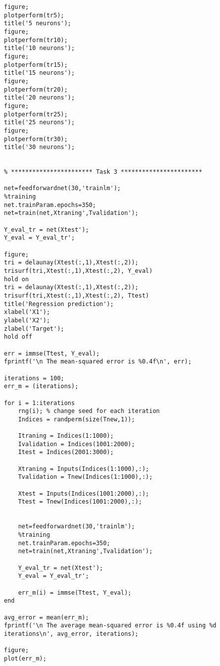 \begin{lstlisting}[frame=single]
figure;
plotperform(tr5);
title('5 neurons');
figure;
plotperform(tr10);
title('10 neurons');
figure;
plotperform(tr15);
title('15 neurons');
figure;
plotperform(tr20);
title('20 neurons');
figure;
plotperform(tr25);
title('25 neurons');
figure;
plotperform(tr30);
title('30 neurons');


% *********************** Task 3 ***********************

net=feedforwardnet(30,'trainlm');
%training
net.trainParam.epochs=350;
net=train(net,Xtraning',Tvalidation');

Y_eval_tr = net(Xtest');
Y_eval = Y_eval_tr';

figure;
tri = delaunay(Xtest(:,1),Xtest(:,2));
trisurf(tri,Xtest(:,1),Xtest(:,2), Y_eval)
hold on
tri = delaunay(Xtest(:,1),Xtest(:,2));
trisurf(tri,Xtest(:,1),Xtest(:,2), Ttest)
title('Regression prediction');
xlabel('X1');
ylabel('X2');
zlabel('Target');
hold off

err = immse(Ttest, Y_eval);
fprintf('\n The mean-squared error is %0.4f\n', err);

iterations = 100;
err_m = (iterations);

for i = 1:iterations
    rng(i); % change seed for each iteration
    Indices = randperm(size(Tnew,1)); 

    Itraning = Indices(1:1000);
    Ivalidation = Indices(1001:2000);
    Itest = Indices(2001:3000);

    Xtraning = Inputs(Indices(1:1000),:);
    Tvalidation = Tnew(Indices(1:1000),:);

    Xtest = Inputs(Indices(1001:2000),:);
    Ttest = Tnew(Indices(1001:2000),:);


    net=feedforwardnet(30,'trainlm');
    %training
    net.trainParam.epochs=350;
    net=train(net,Xtraning',Tvalidation');

    Y_eval_tr = net(Xtest');
    Y_eval = Y_eval_tr';

    err_m(i) = immse(Ttest, Y_eval);
end

avg_error = mean(err_m);
fprintf('\n The average mean-squared error is %0.4f using %d iterations\n', avg_error, iterations);

figure;
plot(err_m);
\end{lstlisting}